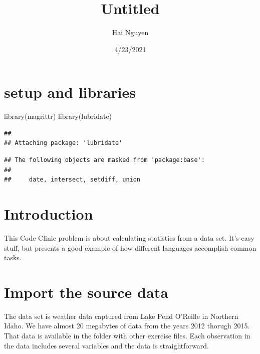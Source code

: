 \documentclass[
  11pt,
]{article}
\title{Untitled}
\author{Hai Nguyen}
\date{4/23/2021}
\newenvironment{Shaded}{\begin{snugshade}}{\end{snugshade}}
\newcommand{\FunctionTok}[1]{\textcolor[rgb]{0.00,0.00,0.00}{#1}}
\newcommand{\NormalTok}[1]{#1}
\begin{document}
\maketitle

{
\setcounter{tocdepth}{2}
\tableofcontents
}
\hypertarget{setup-and-libraries}{%
\section{setup and libraries}\label{setup-and-libraries}}

\begin{Shaded}
\begin{Highlighting}[]
\FunctionTok{library}\NormalTok{(magrittr)}
\FunctionTok{library}\NormalTok{(lubridate)}
\end{Highlighting}
\end{Shaded}

\begin{verbatim}
## 
## Attaching package: 'lubridate'
\end{verbatim}

\begin{verbatim}
## The following objects are masked from 'package:base':
## 
##     date, intersect, setdiff, union
\end{verbatim}

\hypertarget{introduction}{%
\section{Introduction}\label{introduction}}

This Code Clinic problem is about calculating statistics from a data
set. It's easy stuff, but presents a good example of how different
languages accomplish common tasks.

\hypertarget{import-the-source-data}{%
\section{Import the source data}\label{import-the-source-data}}

The data set is weather data captured from Lake Pend O'Reille in
Northern Idaho. We have almost 20 megabytes of data from the years 2012
thorugh 2015. That data is available in the folder with other exercise
files. Each observation in the data includes several variables and the
data is straightforward.
\end{document}
